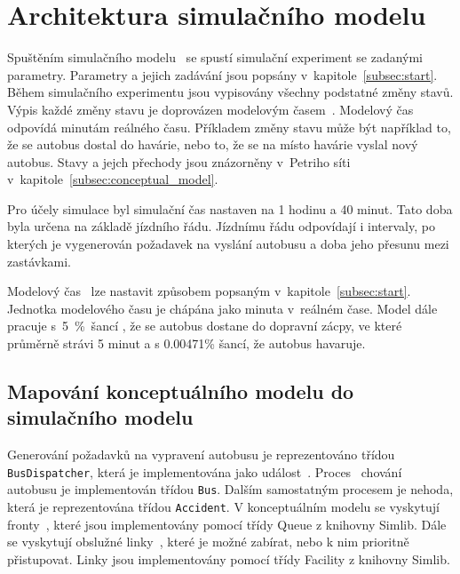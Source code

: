 \documentclass[a4paper]{article}
\begin{document}
    \section{Architektura simulačního modelu}
    \label{sec:architecture}

        Spuštěním simulačního modelu~\cite[snímek 44]{IMS_slides} se spustí simulační experiment se zadanými parametry.
        Parametry a jejich zadávání jsou popsány v~kapitole~\ref{subsec:start}. Během simulačního experimentu jsou vypisovány všechny podstatné změny stavů.
        Výpis každé změny stavu je doprovázen modelovým časem~\cite[snímek 21]{IMS_slides}. Modelový čas odpovídá minutám reálného času. Příkladem změny stavu může být například to, že se autobus dostal do havárie, nebo to, že se na místo havárie vyslal nový autobus. Stavy a jejch přechody jsou znázorněny v~Petriho síti v~kapitole~\ref{subsec:conceptual_model}.

		Pro účely simulace byl simulační čas nastaven na 1 hodinu a 40 minut. Tato doba byla určena na základě jízdního řádu. Jízdnímu řádu odpovídají i intervaly, po kterých je vygenerován požadavek na vyslání autobusu a doba jeho přesunu mezi zastávkami.

        Modelový čas~\cite[snímek 21]{IMS_slides} lze nastavit způsobem popsaným v~kapitole~\ref{subsec:start}. Jednotka modelového času je chápána jako
        minuta v~reálném čase.
        Model dále pracuje s~5~\%~šancí , že se autobus dostane do dopravní zácpy, ve které průměrně strávi 5 minut a s 0.00471\% šancí, že autobus havaruje.

        \subsection{Mapování konceptuálního modelu do simulačního modelu}
        \label{subsec:mapping}

            Generování požadavků na vypravení autobusu je reprezentováno třídou \texttt{BusDispatcher}, která je implementována jako
            událost~\cite[snímek 172]{IMS_slides}. Proces~\cite[snímek 174]{IMS_slides} chování autobusu je implementován třídou \texttt{Bus}. Dalším samostatným procesem je nehoda, která je reprezentována třídou \texttt{Accident}. V konceptuálním modelu se vyskytují fronty~\cite[snímek 141]{IMS_slides}, které jsou implementovány pomocí třídy Queue z knihovny Simlib. Dále se vyskytují obslužné linky~\cite[snímek 62]{IMS_slides}, které je možné zabírat, nebo k nim prioritně přistupovat. Linky jsou implementovány pomocí třídy Facility z knihovny Simlib.
\end{document}

